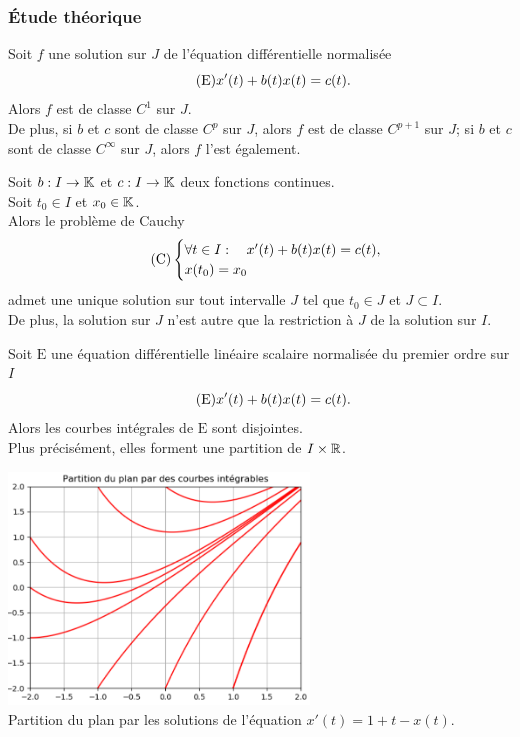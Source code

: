 \documentclass{book}
\begin{document}
\subsubsection{Étude théorique}
\begin{Proposition}
Soit $f$ une solution sur $J$ de l'équation différentielle normalisée
\[\tag{$\mathrm{E}$} x'(t) + b(t) x(t) = c(t).\]
Alors $f$ est de classe $C^1$ sur $J$.\\
De plus, si $b$ et $c$ sont de classe $C^ p$ sur $J$,
alors $f$ est de classe $C^{p+1}$ sur $J$;
si $b$ et $c$ sont de classe $C^{\infty}$ sur $J$, alors $f$ l'est également.
\end{Proposition}
\begin{Theoreme}
Soit $b:I\to \mathbb{K}     $ et $c:I\to \mathbb{K}     $ deux fonctions continues.\\
Soit $t_0\in I$ et $x_0\in \mathbb{K}$.\\
Alors le problème de Cauchy
\[\tag{$\mathrm{C}$}
  \begin{cases}
    \forall t\in I:\quad  x'(t) + b(t) x(t) = c(t), \\
    x(t_0) = x_0
\end{cases}\]
admet une unique solution sur tout intervalle $J$ tel que $t_0\in J$ et $J\subset I$.\\
De plus, la solution sur $J$ n'est autre que la restriction à $J$
de la solution sur $I$.
\end{Theoreme}
\begin{Corollaire}
Soit $\mathrm{E}$ une équation différentielle linéaire scalaire normalisée
du premier ordre sur $I$
\[\tag{$\mathrm{E}$} x'(t) + b(t)x(t) = c(t).\]
Alors les courbes intégrales de $\mathrm{E}$ sont disjointes.\\
Plus précisément, elles forment une partition de $I\times\mathbb{R}$.
\begin{center}
\includegraphics[width=8cm]{C7_equation_differentielle_partition.png}\\
Partition du plan par les solutions de l'équation $x'(t)=1+t-x(t)$.
\end{center}
\end{Corollaire}
\end{document}
